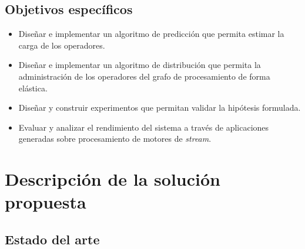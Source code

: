 \documentclass[12pt,letterpaper]{article}
\begin{document}
\subsection{Objetivos específicos}
\begin{itemize}
\item Dise\~nar e implementar un algoritmo de predicci\'on que permita estimar la carga de los operadores.
\item Dise\~nar e implementar un algoritmo de distribuci\'on que permita la administraci\'on de los operadores del grafo de procesamiento de forma el\'astica.
\item Dise\~nar y construir experimentos que permitan validar la hip\'otesis formulada.
\item Evaluar y analizar el rendimiento del sistema a trav\'es de aplicaciones generadas sobre procesamiento de motores de \textsl{stream}.
\end{itemize}

\section{Descripción de la solución propuesta}
\subsection{Estado del arte}
\end{document}
